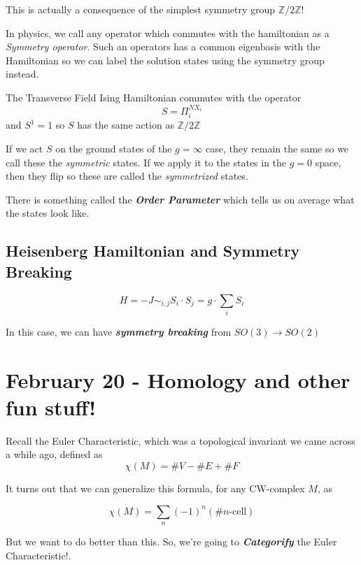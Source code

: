 \documentclass{article}
\begin{document}
\vskip 0.5cm
This is actually a consequence of the simplest symmetry group $\mathbb{Z} / 2 \mathbb{Z}$!

\vskip 0.25cm
In physics, we call any operator which commutes with the hamiltonian as a \emph{Symmetry operator}. Such an operators has a common eigenbasis with the Hamiltonian so we can label the solution states using the symmetry group instead.

\vskip 0.5cm
The Transverse Field Ising Hamiltonian commutes with the operator\[ S = \Pi_i^{N X_i}\] and $S^1 = 1$ so $S$ has the same action as $\mathbb{Z} / 2\mathbb{Z}$ 

\vskip 0.5cm
If we act $S$ on the ground states of the $g = \infty$ case, they remain the same so we call these the \emph{symmetric} states. If we apply it to the states in the $g = 0$ space, then they flip so these are called the \emph{symmetrized} states.

\vskip 1cm
There is something called the \emph{\textbf{Order Parameter}} which tells us on average what the states look like. 


\subsection{Heisenberg Hamiltonian and Symmetry Breaking}

\[ H = -J \sim_{i,j} S_i \cdot S_j = g \cdot \sum_{i} S_i \]

In this case, we can have \emph{\textbf{symmetry breaking}} from $SO(3) \rightarrow SO(2)$

\pagebreak

\section{February 20 - Homology and other fun stuff!}

Recall the Euler Characteristic, which was a topological invariant we came across a while ago, defined as 
\[ \chi(M) = \# V - \# E + \#F \]


It turns out that we can generalize this formula, for any CW-complex $M$, as 

\[ \boxed{\chi(M) = \sum_{n} (-1)^{n} \left(\# n\text{-cell}\right)} \]

\vskip 0.5cm
But we want to do better than this. So, we're going to \emph{\textbf{Categorify}} the Euler Characteristic!.
\end{document}
